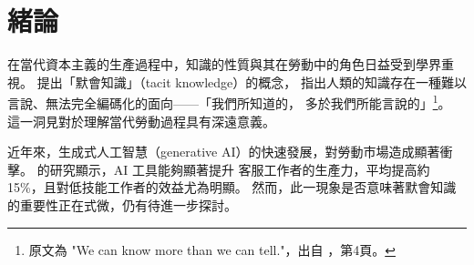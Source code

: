 \section{緒論}

在當代資本主義的生產過程中，知識的性質與其在勞動中的角色日益受到學界重視。
\textcite{polanyiTacitDimension1966}提出「默會知識」（tacit knowledge）的概念，
指出人類的知識存在一種難以言說、無法完全編碼化的面向——「我們所知道的，
多於我們所能言說的」\footnote{%
  原文為 "We can know more than we can tell."，出自
  ，第4頁。}。
這一洞見對於理解當代勞動過程具有深遠意義。

近年來，生成式人工智慧（generative AI）的快速發展，對勞動市場造成顯著衝擊。
\textcite{brynjolfssonGenerativeAIWork2025}的研究顯示，AI 工具能夠顯著提升
客服工作者的生產力，平均提高約 15\%，且對低技能工作者的效益尤為明顯。
然而，此一現象是否意味著默會知識的重要性正在式微，仍有待進一步探討。
